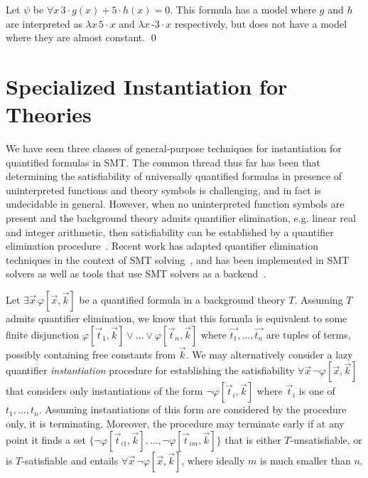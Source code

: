 \documentclass{easychair}
\begin{document}
\begin{example}
Let $\psi$ be $\forall x\, 3 \cdot g( x ) + 5 \cdot h( x ) = 0$.
This formula has a model where $g$ and $h$ are interpreted as $\lambda x\, 5 \cdot x$ and $\lambda x\, \text{-}3 \cdot x$ respectively,
but does not have a model where they are almost constant.
\qed
\end{example}


\section{Specialized Instantiation for Theories}
\label{sec:cegqi}

We have seen three classes of general-purpose techniques 
for instantiation for quantified formulas in SMT.
The common thread thus far has been that determining the satisfiability of universally quantified formulas in presence
of uninterpreted functions and theory symbols is challenging, and in fact is undecidable in general.
However, when no uninterpreted function symbols are present and the background theory admits quantifier elimination, 
e.g. linear real and integer arithmetic, then satisfiability 
can be established by a quantifier elimination procedure~\cite{cooper1972,FerranteRackoff79ComputationalComplexityLogicalTheories,Loos93applyinglinear}.
Recent work has adapted quantifier elimination techniques in the context of SMT solving~\cite{monniaux2010quantifier,ReynoldsDKBT15Cav,DBLP:conf/lpar/BjornerJ15},
and has been implemented in SMT solvers
as well as tools that use SMT solvers as a backend~\cite{komuravelli2014smt,DBLP:conf/lpar/FedyukovichGS15}.

Let $\exists \vec x\, \varphi[ \vec x, \vec k ]$ be a quantified formula in a background theory $T$.
Assuming $T$ admits quantifier elimination, we know that this formula is equivalent to some finite disjunction
$\varphi[ \vec t_1, \vec k ] \vee \ldots \vee \varphi[ \vec t_n, \vec k ]$ where $\vec{t_1}, \ldots, \vec{t_n}$ are tuples of terms, possibly containing free constants from $\vec k$.
We may alternatively consider a lazy quantifier \emph{instantiation} procedure for establishing the satisfiability 
$\forall \vec x\, \neg \varphi[ \vec x, \vec k ]$ that considers only instantiations of the form 
$\neg \varphi[ \vec t_i, \vec k ]$ where $\vec t_i$ is one of $t_1, \ldots, t_n$.
Assuming instantiations of this form are considered by the procedure only, it is terminating.
Moreover, the procedure may terminate early if at any point it finds a set
$\{ \neg \varphi[ \vec t_{i1}, \vec k ], \ldots, \neg \varphi[ \vec t_{im}, \vec k ] \}$ that is either
$T$-unsatisfiable, or is $T$-satisfiable and entails $\forall \vec x\, \neg \varphi[ \vec x, \vec k ]$,
where ideally $m$ is much smaller than $n$.
\end{document}
